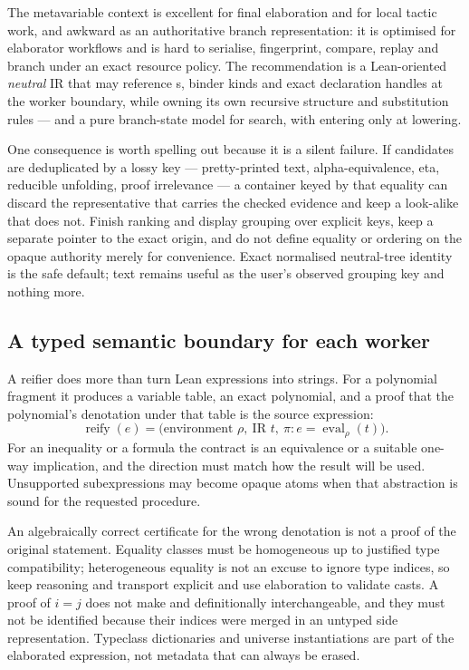 The metavariable context is excellent for final elaboration and for local
tactic work, and awkward as an authoritative branch representation: it is
optimised for elaborator workflows and is hard to serialise, fingerprint,
compare, replay and branch under an exact resource policy. The recommendation
is a Lean-oriented \emph{neutral} IR that may reference s, binder
kinds and exact declaration handles at the worker boundary, while owning its
own recursive structure and substitution rules --- and a pure branch-state
model for search, with  entering only at lowering.

\begin{remark}
One consequence is worth spelling out because it is a silent failure. If
candidates are deduplicated by a lossy key --- pretty-printed text,
alpha-equivalence, eta, reducible unfolding, proof irrelevance --- a container
keyed by that equality can discard the representative that carries the checked
evidence and keep a look-alike that does not. Finish ranking and display
grouping over explicit keys, keep a separate pointer to the exact origin, and
do not define equality or ordering on the opaque authority merely for
convenience. Exact normalised neutral-tree identity is the safe default; text
remains useful as the user's observed grouping key and nothing more.
\end{remark}

\subsection{A typed semantic boundary for each worker}

A reifier does more than turn Lean expressions into strings. For a polynomial
fragment it produces a variable table, an exact polynomial, and a proof that the
polynomial's denotation under that table is the source expression:
\[
\operatorname{reify}(e)
  =\bigl(\text{environment }\rho,\ \text{IR }t,\
    \pi: e=\operatorname{eval}_{\rho}(t)\bigr).
\]
For an inequality or a formula the contract is an equivalence or a suitable
one-way implication, and the direction must match how the result will be used.
Unsupported subexpressions may become opaque atoms when that abstraction is
sound for the requested procedure.

An algebraically correct certificate for the wrong denotation is not a proof of
the original statement. Equality classes must be homogeneous up to justified
type compatibility; heterogeneous equality is not an excuse to ignore type
indices, so keep \code{HEq} reasoning and transport explicit and use elaboration
to validate casts. A proof of $i=j$ does not make \code{Vector A i} and
\code{Vector A j} definitionally interchangeable, and they must not be identified
because their indices were merged in an untyped side representation. Typeclass
dictionaries and universe instantiations are part of the elaborated expression,
not metadata that can always be erased.

